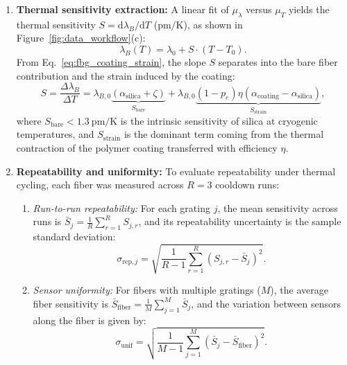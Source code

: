 \documentclass[preprint,11pt]{elsarticle}
\begin{document}
\begin{enumerate}
    \item \textbf{Thermal sensitivity extraction:}
    A linear fit of $\mu_\lambda$ versus $\mu_T$ yields the thermal sensitivity $S = \mathrm{d}\lambda_B/\mathrm{d}T$ ($\text{pm/K}$), as shown in Figure~\ref{fig:data_workflow}(c):
    \begin{equation}
        \lambda_B(T) = \lambda_0 + S \cdot (T - T_0).
        \label{eq:linear_sensitivity}
    \end{equation}
    From Eq.~\ref{eq:fbg_coating_strain}, the slope $S$ separates into the bare fiber contribution and the strain induced by the coating:
    \begin{equation}
        S = \frac{\Delta \lambda_B}{\Delta T} = \lambda_{B,0} \underbrace{(\alpha_{\text{silica}} + \zeta)}_{S_{\text{bare}}} + \lambda_{B,0} \underbrace{(1 - p_e) \eta (\alpha_{\text{coating}} - \alpha_{\text{silica}})}_{S_{\text{strain}}},
        \label{eq:sensitivity_physics}
    \end{equation}
    where $S_{\text{bare}} < 1.3~\text{pm/K}$ is the intrinsic sensitivity of silica at cryogenic temperatures, and $S_{\text{strain}}$ is the dominant term coming from the thermal contraction of the polymer coating transferred with efficiency $\eta$.

    \item \textbf{Repeatability and uniformity:}
    To evaluate repeatability under thermal cycling, each fiber was measured across $R = 3$ cooldown runs:
    \begin{enumerate}
        \item \textit{Run-to-run repeatability:} For each grating $j$, the mean sensitivity across runs is $\bar{S}_j = \frac{1}{R}\sum_{r=1}^R S_{j,r}$, and its repeatability uncertainty is the sample standard deviation:
        \begin{equation}
            \sigma_{\text{rep}, j} = \sqrt{\frac{1}{R - 1} \sum_{r=1}^{R} (S_{j,r} - \bar{S}_j)^2}.
            \label{eq:repeatability_error}
        \end{equation}
        \item \textit{Sensor uniformity:} For fibers with multiple gratings ($M$), the average fiber sensitivity is $\bar{S}_{\text{fiber}} = \frac{1}{M}\sum_{j=1}^M \bar{S}_j$, and the variation between sensors along the fiber is given by:
        \begin{equation}
            \sigma_{\text{unif}} = \sqrt{\frac{1}{M - 1} \sum_{j=1}^{M} (\bar{S}_j - \bar{S}_{\text{fiber}})^2}.
        \end{equation}
    \end{enumerate}
\end{enumerate}
\end{document}
